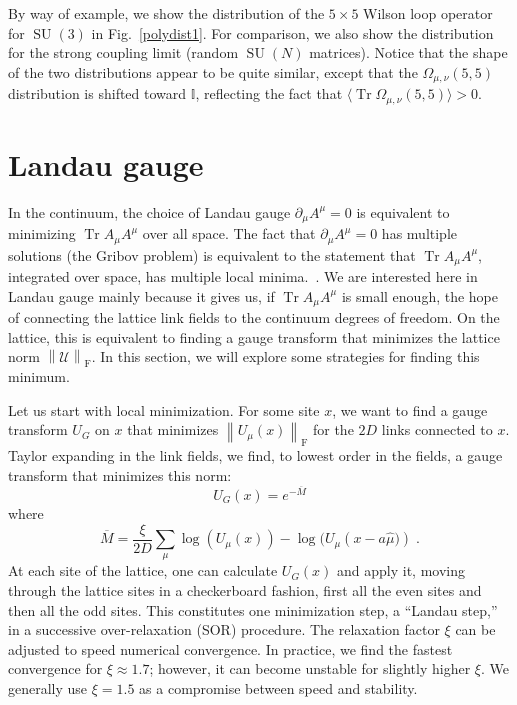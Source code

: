 \documentclass[preprint,aps,prd]{revtex4-2}
\newcommand{\be}{\begin{equation}}
\newcommand{\eq}{\end{equation}}
\newcommand{\config}{\mathcal{U}}
\newcommand{\orelax}{\xi}
\newcommand\wilson[4]{\Omega_{#1, #2}\left(#3,#4\right)}
\DeclareMathOperator{\SU}{SU}
\DeclareMathOperator{\Tr}{Tr}
\newcommand\fnorm[1]{\left\lVert #1 \right\rVert_\mathrm{F}}
\begin{document}
By way of example, we show the distribution of the
$5\times5$ Wilson loop operator for $\SU(3)$ in Fig.~\ref{polydist1}.
For comparison, we also show the distribution for
the strong coupling limit (random $\SU(N)$ matrices).
Notice that the shape of the two distributions appear to
be quite similar, except that the $\wilson{\mu}{\nu}{5}{5}$ distribution
is shifted toward $\mathbb{I}$, reflecting the fact that
$\langle\Tr \wilson{\mu}{\nu}{5}{5}\rangle >0$.


\section{Landau gauge}

In the continuum, the choice of Landau gauge $\partial_\mu A^\mu = 0$
is equivalent to minimizing $\Tr A_\mu A^\mu$ over all space.  The fact that
$\partial_\mu A^\mu = 0$ has multiple solutions (the Gribov problem) is
equivalent to the statement that $\Tr A_\mu A^\mu$, integrated over space,
has multiple local minima.~\cite{maas_more_2009}.
We are interested here in Landau gauge mainly
because it gives us, if $\Tr A_\mu A^\mu$ is small enough, the
hope of connecting the lattice
link fields to the continuum degrees of freedom.
On the lattice, this is equivalent to finding a gauge transform
that minimizes the lattice norm $\fnorm{\config}$.  In this
section, we will explore some strategies for finding this minimum.

Let us start with local minimization.
For some site $x$, we want to find a gauge transform $U_G$ on $x$
that minimizes $\fnorm{U_\mu(x)}$ for the $2D$
links connected to $x$.  Taylor expanding in the link fields,
we find, to lowest order in the fields, a gauge transform
that minimizes this norm:
%
\be
          U_G(x) = e^{- \overline{M}}
\eq
where
\be
   \overline{M} = \frac{\orelax}{2 D} \sum_\mu \log\left(U_\mu(x)\right) -
   \log(U_\mu\left(x-a \hat{\mu})\right)  \; . \label{landau}
\eq
At each site of the lattice, one can calculate $U_G(x)$ and apply it,
moving through the lattice sites in a checkerboard fashion,
first all the even sites and then all the odd sites.
This constitutes one minimization step, a ``Landau step,'' in a
successive over-relaxation (SOR) procedure.
The relaxation factor $\orelax$ can be adjusted to speed numerical
convergence.
In practice, we find the fastest convergence for $\orelax \approx 1.7$;
however, it can become unstable for slightly higher $\orelax$.
We generally use $\orelax=1.5$ as a compromise between speed and stability.
\end{document}
